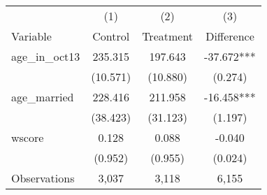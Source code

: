 \begin{tabular}{l*{3}c}
\hline\hline
 & (1) & (2) & (3) \\
Variable & Control & Treatment & Difference \\
\hline
age\_in\_oct13&235.315&197.643&-37.672***\\
&(10.571)&(10.880)&(0.274)\\
age\_married&228.416&211.958&-16.458***\\
&(38.423)&(31.123)&(1.197)\\
wscore&0.128&0.088&-0.040\\
&(0.952)&(0.955)&(0.024)\\
\hline
Observations & 3,037 & 3,118 & 6,155 \\
\hline\hline
\end{tabular}
